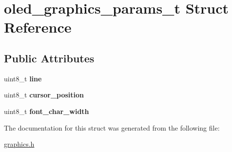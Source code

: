 \hypertarget{structoled__graphics__params__t}{}\section{oled\+\_\+graphics\+\_\+params\+\_\+t Struct Reference}
\label{structoled__graphics__params__t}
\subsection*{Public Attributes}
\begin{DoxyCompactItemize}
\item 
\mbox{\label{structoled__graphics__params__t_a935849122ab6104f2c37fc0a0ede6030}} 
uint8\+\_\+t {\bfseries line}
\item 
\mbox{\label{structoled__graphics__params__t_ae2b6e0c9eaa48f8fbdb79e16ed3ad05d}} 
uint8\+\_\+t {\bfseries cursor\+\_\+position}
\item 
\mbox{\label{structoled__graphics__params__t_ac0dc31a850b44af05036f527d7a42e36}} 
uint8\+\_\+t {\bfseries font\+\_\+char\+\_\+width}
\end{DoxyCompactItemize}


The documentation for this struct was generated from the following file\+:\begin{DoxyCompactItemize}
\item 
\hyperlink{graphics_8h}{graphics.\+h}\end{DoxyCompactItemize}
